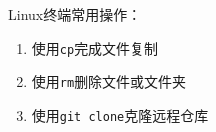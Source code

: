 \documentclass{ctexart}
\begin{document}
Linux终端常用操作：
\begin{enumerate}
    \item 使用\texttt{cp}完成文件复制
    \item 使用\texttt{rm}删除文件或文件夹
    \item 使用\texttt{git clone}克隆远程仓库
\end{enumerate}
\end{document}
